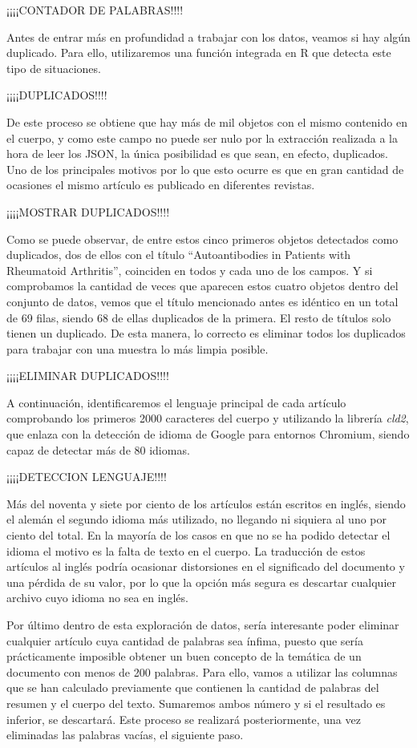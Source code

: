 \documentclass[10pt, a4paper]{article}
\begin{document}
¡¡¡¡CONTADOR DE PALABRAS!!!!

Antes de entrar más en profundidad a trabajar con los datos, veamos si hay algún duplicado. Para ello, utilizaremos una función integrada en R que detecta este tipo de situaciones.

¡¡¡¡DUPLICADOS!!!!

De este proceso se obtiene que hay más de mil objetos con el mismo contenido en el cuerpo, y como este campo no puede ser nulo por la extracción realizada a la hora de leer los JSON, la única posibilidad es que sean, en efecto, duplicados. Uno de los principales motivos por lo que esto ocurre es que en gran cantidad de ocasiones el mismo artículo es publicado en diferentes revistas.

¡¡¡¡MOSTRAR DUPLICADOS!!!!

Como se puede observar, de entre estos cinco primeros objetos detectados como duplicados, dos de ellos con el título ``Autoantibodies in Patients with Rheumatoid Arthritis'', coinciden en todos y cada uno de los campos. Y si comprobamos la cantidad de veces que aparecen estos cuatro objetos dentro del conjunto de datos, vemos que el título mencionado antes es idéntico en un total de 69 filas, siendo 68 de ellas duplicados de la primera. El resto de títulos solo tienen un duplicado. De esta manera, lo correcto es eliminar todos los duplicados para trabajar con una muestra lo más limpia posible.

¡¡¡¡ELIMINAR DUPLICADOS!!!!

A continuación, identificaremos el lenguaje principal de cada artículo comprobando los primeros 2000 caracteres del cuerpo y utilizando la librería \textit{cld2}, que enlaza con la detección de idioma de Google para entornos Chromium, siendo capaz de detectar más de 80 idiomas. 

¡¡¡¡DETECCION LENGUAJE!!!!

Más del noventa y siete por ciento de los artículos están escritos en inglés, siendo el alemán el segundo idioma más utilizado, no llegando ni siquiera al uno por ciento del total. En la mayoría de los casos en que no se ha podido detectar el idioma el motivo es la falta de texto en el cuerpo. La traducción de estos artículos al inglés podría ocasionar distorsiones en el significado del documento y una pérdida de su valor, por lo que la opción más segura es descartar cualquier archivo cuyo idioma no sea en inglés. 

Por último dentro de esta exploración de datos, sería interesante poder eliminar cualquier artículo cuya cantidad de palabras sea ínfima, puesto que sería prácticamente imposible obtener un buen concepto de la temática de un documento con menos de 200 palabras. Para ello, vamos a utilizar las columnas que se han calculado previamente que contienen la cantidad de palabras del resumen y el cuerpo del texto. Sumaremos ambos número y si el resultado es inferior, se descartará. Este proceso se realizará posteriormente, una vez eliminadas las palabras vacías, el siguiente paso.
\end{document}
